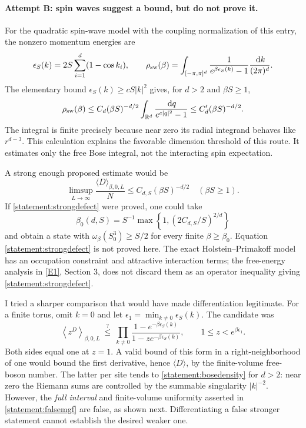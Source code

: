 \documentclass[11pt]{article}
\newcommand{\R}{\mathbb{R}}
\newcommand{\dd}{\,\mathrm d}
\newcommand{\eref}[2]{\hyperlink{extra:#1:#2}{[E#2]}}
\begin{document}
	\paragraph{Attempt B: spin waves suggest a bound, but do not prove it.}
	For the quadratic spin-wave model with the coupling normalization of
	this entry, the nonzero momentum energies are
	\[
	\epsilon_S(k)=2S\sum_{i=1}^d(1-\cos k_i),\qquad
	\rho_{\rm sw}(\beta)=
	\int_{[-\pi,\pi]^d}\frac{1}{e^{\beta\epsilon_S(k)}-1}
	\frac{\dd k}{(2\pi)^d}.
	\]
	The elementary bound $\epsilon_S(k)\geq cS|k|^2$ gives, for $d>2$ and
	$\beta S\geq1$,
	\begin{equation}\label{statement:bosedensity}
		\rho_{\rm sw}(\beta)
		\leq C_d(\beta S)^{-d/2}
		\int_{\R^d}\frac{\dd q}{e^{c|q|^2}-1}
		\leq C_d'(\beta S)^{-d/2}.
	\end{equation}
	The integral is finite precisely because near zero its radial
	integrand behaves like $r^{d-3}$. This calculation explains the
	favorable dimension threshold of this route. It estimates only the
	free Bose integral, not the interacting spin expectation.
	
	A strong enough proposed estimate would be
	\begin{equation}\label{statement:strongdefect}
		\limsup_{L\to\infty}\frac{\langle D\rangle_{\beta,0,L}}{N}
		\leq C_{d,S}(\beta S)^{-d/2}
		\quad(\beta S\geq1). \tag{SD}
	\end{equation}
	If \eqref{statement:strongdefect} were proved, one could take
	\[
	\beta_0(d,S)=S^{-1}\max\left\{1,
	(2C_{d,S}/S)^{2/d}\right\}
	\]
	and obtain a state with $\omega_\beta(S_0^3)\geq S/2$ for every finite
	$\beta\geq\beta_0$. Equation \eqref{statement:strongdefect} is not proved
	here. The exact Holstein--Primakoff model has an occupation constraint
	and attractive interaction terms; the free-energy analysis in
	\eref{statement}{1}, Section 3, does not discard them as an operator
	inequality giving \eqref{statement:strongdefect}.
	
	I tried a sharper comparison that would have made differentiation
	legitimate. For a finite torus, omit $k=0$ and let
	$\epsilon_1=\min_{k\ne0}\epsilon_S(k)$. The candidate was
	\begin{equation}\label{statement:falsemgf}
		\left\langle z^D\right\rangle_{\beta,0,L}
		\ \stackrel{?}{\leq}\
		\prod_{k\ne0}\frac{1-e^{-\beta\epsilon_S(k)}}
		{1-ze^{-\beta\epsilon_S(k)}},
		\qquad 1\leq z<e^{\beta\epsilon_1}.
	\end{equation}
	Both sides equal one at $z=1$. A valid bound of this form in a
	right-neighborhood of one would bound the first derivative, hence
	$\langle D\rangle$, by the finite-volume free-boson number. The latter
	per site tends to \eqref{statement:bosedensity} for $d>2$: near zero the
	Riemann sums are controlled by the summable singularity $|k|^{-2}$.
	However, the \emph{full interval} and finite-volume uniformity asserted
	in \eqref{statement:falsemgf} are false, as shown next. Differentiating a
	false stronger statement cannot establish the desired weaker one.
	
\end{document}
